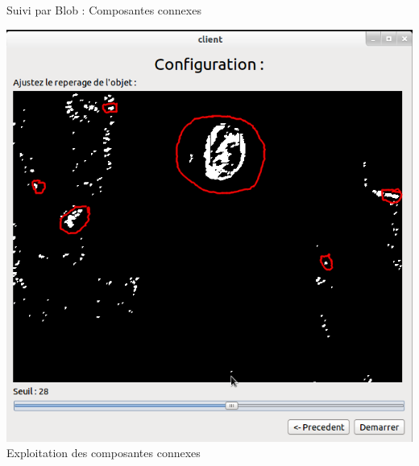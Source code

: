 \documentclass{beamer}
\begin{document}
            \begin{frame}{Suivi par Blob : Composantes connexes}
                  \begin{center}
                        \includegraphics[scale=0.25]{Capture5.png}\\
                        Exploitation des composantes connexes
                  \end{center}
            \end{frame}
\end{document}
